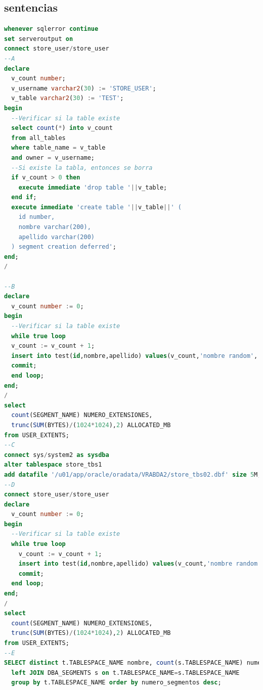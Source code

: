 \documentclass[journal]{IEEEtran}
\begin{document}
\subsection{sentencias}
\begin{lstlisting}[language=sql, caption=s-00-tablespaces.sql,label={lst:codigo1}]
  whenever sqlerror continue
set serveroutput on
connect store_user/store_user
--A
declare
  v_count number;
  v_username varchar2(30) := 'STORE_USER';
  v_table varchar2(30) := 'TEST';
begin
  --Verificar si la table existe
  select count(*) into v_count
  from all_tables
  where table_name = v_table
  and owner = v_username;
  --Si existe la tabla, entonces se borra
  if v_count > 0 then
    execute immediate 'drop table '||v_table;
  end if;
  execute immediate 'create table '||v_table||' (
    id number,
    nombre varchar(200),
    apellido varchar(200)
  ) segment creation deferred';
end;
/

--B
declare
  v_count number := 0;
begin
  --Verificar si la table existe
  while true loop
  v_count := v_count + 1;
  insert into test(id,nombre,apellido) values(v_count,'nombre random','apellido random');
  commit;
  end loop;
end;
/
select
  count(SEGMENT_NAME) NUMERO_EXTENSIONES,
  trunc(SUM(BYTES)/(1024*1024),2) ALLOCATED_MB
from USER_EXTENTS;
--C
connect sys/system2 as sysdba
alter tablespace store_tbs1
add datafile '/u01/app/oracle/oradata/VRABDA2/store_tbs02.dbf' size 5M;
--D
connect store_user/store_user
declare
  v_count number := 0;
begin
  --Verificar si la table existe
  while true loop
    v_count := v_count + 1;
    insert into test(id,nombre,apellido) values(v_count,'nombre random','apellido random');
    commit;
  end loop;
end;
/
select 
  count(SEGMENT_NAME) NUMERO_EXTENSIONES,
  trunc(SUM(BYTES)/(1024*1024),2) ALLOCATED_MB
from USER_EXTENTS;
--E
SELECT distinct t.TABLESPACE_NAME nombre, count(s.TABLESPACE_NAME) numero_segmentos FROM DBA_TABLESPACES t
  left JOIN DBA_SEGMENTS s on t.TABLESPACE_NAME=s.TABLESPACE_NAME
  group by t.TABLESPACE_NAME order by numero_segmentos desc;
\end{lstlisting}
\end{document}
